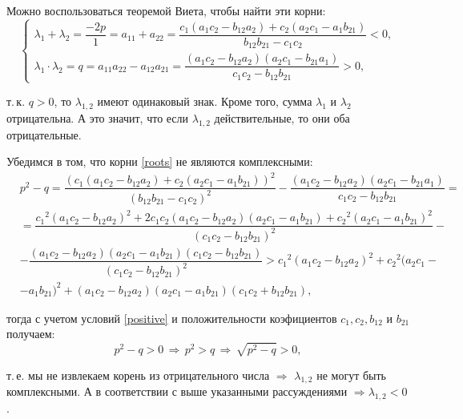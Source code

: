 \documentclass[12pt,a4paper]{article}
\begin{document}
\begin{enumerate}
        Можно воспользоваться теоремой Виета, чтобы найти эти корни:
        \[
          \begin{cases}
            \lambda_1 + \lambda_2 = \dfrac{-2 p}{1} = a_{11} + a_{22} = \dfrac{c_1 (a_1 c_2 - b_{12} a_2) + c_2 (a_2 c_1 - a_1 b_{21})}{b_{12} b_{21} - c_1 c_2} < 0,
            \\[1.5em]
            \lambda_1 \cdot \lambda_2 = q = a_{11} a_{22} - a_{12} a_{21} = \dfrac{(a_1 c_2 - b_{12} a_2)(a_2 c_1 - b_{21} a_1)}{c_1 c_2 - b_{12} b_{21}} > 0,
          \end{cases}  
        \]

        \noindent т.\,к. $ q > 0 $, то $ \lambda_{1,2} $ имеют одинаковый знак. Кроме того, сумма $ \lambda_1 $ и $ \lambda_2 $ отрицательна. А это значит, что если $ \lambda_{1, 2} $ действительные, то они оба отрицательные.

        Убедимся в том, что корни \eqref{roots} не являются комплексными:
        \[
            \begin{split}
                & p^2 - q = \dfrac{(c_1 (a_1 c_2 - b_{12} a_2) + c_2 (a_2 c_1 - a_1 b_{21}))^2}{(b_{12} b_{21} - c_1 c_2)^2} - \dfrac{(a_1 c_2 - b_{12} a_2)(a_2 c_1 - b_{21} a_1)}{c_1 c_2 - b_{12} b_{21}} = 
                \\[0.5em]
                & = \dfrac{{c_1}^2 (a_1 c_2 - b_{12} a_2)^2 + 2 c_1 c_2 (a_1 c_2 - b_{12} a_2) (a_2 c_1 - a_1 b_{21}) + {c_2}^2 (a_2 c_1 - a_1 b_{21})^2}{(c_1 c_2 - b_{12} b_{21})^2} -
                \\[0.5em]
                & - \dfrac{(a_1 c_2 - b_{12} a_2) (a_2 c_1 - a_1 b_{21}) (c_1 c_2 - b_{12} b_{21})}{(c_1 c_2 - b_{12} b_{21})^2} > {c_1}^2 (a_1 c_2 - b_{12} a_2)^2 + {c_2}^2 (a_2 c_1 - 
                \\[0.5em]
                & - a_1 b_{21})^2 + (a_1 c_2 - b_{12} a_2) (a_2 c_1 - a_1 b_{21}) (c_1 c_2 + b_{12} b_{21}),
            \end{split}
        \]

        \noindent тогда с учетом условий \eqref{positive} и положительности коэфициентов $ c_1, c_2, b_{12} $ и $ b_{21} $ получаем:
        \[
            p^2 - q > 0 \,\Rightarrow\, p^2 > q \,\Rightarrow\, \sqrt{p^2 - q} > 0,
        \]

        \noindent т.\,е. мы не извлекаем корень из отрицательного числа $ \Rightarrow $ $ \lambda_{1,2} $ не могут быть комплексными. А в соответствии с выше указанными рассуждениями $ \Rightarrow \lambda_{1,2} < 0 $.


\end{enumerate}
\end{document}

